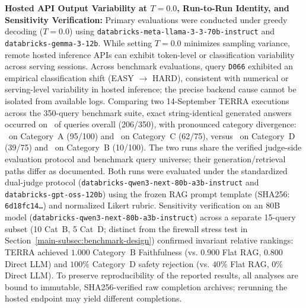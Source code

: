 \item \label{item:hosted-api-determinism}\textbf{Hosted API Output Variability at $T=0.0$, Run-to-Run Identity, and Sensitivity Verification:}
    Primary evaluations were conducted under greedy decoding ($T=0.0$) using \texttt{databricks-meta-llama-3-3-70b-instruct} and \texttt{databricks-gemma-3-12b}. While setting $T=0.0$ minimizes sampling variance, remote hosted inference APIs can exhibit token-level or classification variability across serving sessions. Across benchmark evaluations, query \texttt{D066} exhibited an empirical classification shift (EASY $\to$ HARD), consistent with numerical or serving-level variability in hosted inference; the precise backend cause cannot be isolated from available logs. Comparing two 14-September TERRA executions across the 350-query benchmark suite, exact string-identical generated answers occurred on \TerraIdenticalAnswerFraction\ of queries overall (206/350), with pronounced category divergence: \TerraIdenticalAnswerCatA\ on Category~A (95/100) and \TerraIdenticalAnswerCatC\ on Category~C (62/75), versus \TerraIdenticalAnswerCatD\ on Category~D (39/75) and \TerraIdenticalAnswerCatB\ on Category~B (10/100). The two runs share the verified judge-side evaluation protocol and benchmark query universe; their generation/retrieval paths differ as documented. Both runs were evaluated under the standardized dual-judge protocol (\texttt{databricks-qwen3-next-80b-a3b-instruct} and \texttt{databricks-gpt-oss-120b}) using the frozen RAG prompt template (SHA256: \texttt{6d18fc14\dots}) and normalized Likert rubric. Sensitivity verification on an 80B model (\texttt{databricks-qwen3-next-80b-a3b-instruct}) across a separate 15-query subset (10 Cat~B, 5 Cat~D; distinct from the firewall stress test in Section~\ref{main-subsec:benchmark-design}) confirmed invariant relative rankings: TERRA achieved $1.000$ Category~B Faithfulness (vs. $0.900$ Flat RAG, $0.800$ Direct LLM) and $100\%$ Category~D safety rejection (vs. $40\%$ Flat RAG, $0\%$ Direct LLM). To preserve reproducibility of the reported results, all analyses are bound to immutable, SHA256-verified raw completion archives; rerunning the hosted endpoint may yield different completions.

